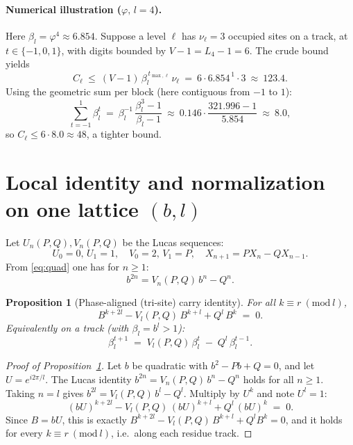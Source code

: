 \documentclass[11pt]{article}
\newtheorem{proposition}[theorem]{Proposition}
\theoremstyle{definition}
\theoremstyle{remark}
\begin{document}
\paragraph{Numerical illustration ($\varphi,\,l=4$).}
Here $\beta_l=\varphi^4\approx 6.854$. Suppose a level $\ell$ has $\nu_\ell=3$ occupied sites on a track, at $t\in\{-1,0,1\}$, with digits bounded by $V-1=L_4-1=6$. The crude bound yields
\[
C_\ell \ \le\ (V-1)\,\beta_l^{\,t_{\max,\ell}}\,\nu_\ell \ =\ 6\cdot 6.854^{\,1}\cdot 3\ \approx\ 123.4.
\]
Using the geometric sum per block (here contiguous from $-1$ to $1$):
\[
\sum_{t=-1}^{1} \beta_l^{t} \ =\ \beta_l^{-1}\,\frac{\beta_l^{3}-1}{\beta_l-1}
\ \approx\ 0.146\cdot \frac{321.996-1}{5.854} \ \approx\ 8.0,
\]
so $C_\ell\le 6\cdot 8.0\approx 48$, a tighter bound.

\section{Local identity and normalization on one lattice $(b,l)$}\label{sec:one-lattice}

Let $U_n(P,Q),V_n(P,Q)$ be the Lucas sequences:
\[
U_0=0,\,U_1=1,\quad V_0=2,\,V_1=P,\quad X_{n+1}=P X_n - Q X_{n-1}.
\]
From \eqref{eq:quad} one has for $n\ge1$:
\begin{equation}\label{eq:lucas-power}
b^{2n}=V_n(P,Q)\,b^n - Q^n.
\end{equation}

\begin{proposition}[Phase-aligned (tri-site) carry identity]\label{prop:carry-general}
For all $k\equiv r\ (\mathrm{mod}\ l)$,
\begin{equation}\label{eq:carry-general}
B^{k+2l} - V_l(P,Q)\,B^{k+l} + Q^{l}\,B^{k} \;=\; 0.
\end{equation}
Equivalently on a track (with $\beta_l=b^l>1$):
\[
\beta_l^{t+1} \;=\; V_l(P,Q)\,\beta_l^t \;-\; Q^l\,\beta_l^{t-1}.
\]
\end{proposition}

\begin{proof}[Proof of Proposition~\ref{prop:carry-general}]
Let $b$ be quadratic with $b^2-Pb+Q=0$, and let $U=e^{i2\pi/l}$. The Lucas identity
$b^{2n}=V_n(P,Q)\,b^{n}-Q^{n}$ holds for all $n\ge1$. Taking $n=l$ gives
$b^{2l}=V_l(P,Q)\,b^{l}-Q^l$. Multiply by $U^{k}$ and note $U^{l}=1$:
\[
(bU)^{k+2l} - V_l(P,Q)\,(bU)^{k+l} + Q^{l}\,(bU)^k \;=\; 0.
\]
Since $B=bU$, this is exactly $B^{k+2l} - V_l(P,Q)\,B^{k+l} + Q^{l}B^k=0$, and it holds for every $k\equiv r\ (\mathrm{mod}\ l)$, i.e.\ along each residue track.
\end{proof}
\end{document}

